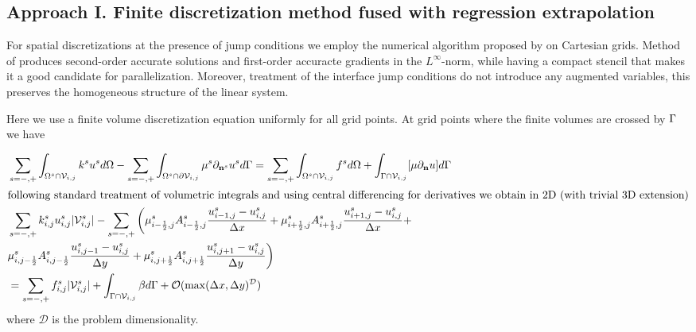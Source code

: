 \documentclass{elsarticle}
\begin{document}
\subsection{Approach I. Finite discretization method fused with regression extrapolation}\label{sec::FD}

For spatial discretizations at the presence of jump conditions we employ the numerical algorithm proposed by \cite{bochkov2020solving} on Cartesian grids. Method of \cite{bochkov2020solving} produces second-order accurate solutions and first-order accuracte gradients in the $L^\infty$-norm, while having a compact stencil that makes it a good candidate for parallelization. Moreover, treatment of the interface jump conditions do not introduce any augmented variables, this preserves the homogeneous structure of the linear system.

Here we use a finite volume discretization equation uniformly for all grid points. At grid points where the finite volumes are crossed by $\rm \Gamma$ we have

\begin{align*}
	 & \sum_{s=-,+}\int_{\Omega^s \cap \mathcal{V}_{i,j}}  k^{s} u^{s} d\Omega -\sum_{s=-,+} \int_{\Omega^s\cap \partial\mathcal{V}_{i,j}} \mu^{s}\partial_{\mathbf{n}^s} u^s  d\Gamma = \sum_{s=-,+}\int_{\Omega^s \cap \mathcal{V}_{i,j}}  f^{s} d\Omega + \int_{\Gamma \cap \mathcal{V}_{i,j}}[\mu\partial_{\mathbf{n}}u]d\Gamma \\
	\intertext{following standard treatment of volumetric integrals and using central differencing for derivatives we obtain in 2D (with trivial 3D extension)}
	 & \sum_{s=-,+} k_{i,j}^s u_{i,j}^{s} |\mathcal{V}_{i,j}^s| - \sum_{s=-,+}\bigg( \mu_{i-\frac{1}{2},j}^s A_{i-\frac{1}{2},j}^s\frac{u_{i-1,j}^s - u_{i,j}^s}{\Delta x}     +   \mu_{i+\frac{1}{2},j}^s A_{i+\frac{1}{2},j}^s\frac{u_{i+1,j}^s - u_{i,j}^s}{\Delta x} +                                                          \\
	 & \mu_{i, j-\frac{1}{2}}^s A_{i, j-\frac{1}{2}}^s\frac{u_{i,j-1}^s - u_{i,j}^s}{\Delta y} + \mu_{i, j+\frac{1}{2}}^s A_{i, j+\frac{1}{2}}^s\frac{u_{i,j+1}^s - u_{i,j}^s}{\Delta y} \bigg)                                                                                                                                     \\
	 & =  \sum_{s=-,+} f_{i,j}^{s} |\mathcal{V}_{i,j}^s| + \int_{\Gamma\cap \mathcal{V}_{i,j}} \beta d\Gamma + \mathcal{O}(\max(\Delta x, \Delta y)^\mathcal{D})
\end{align*}
where $\mathcal{D}$ is the problem dimensionality.
\end{document}
